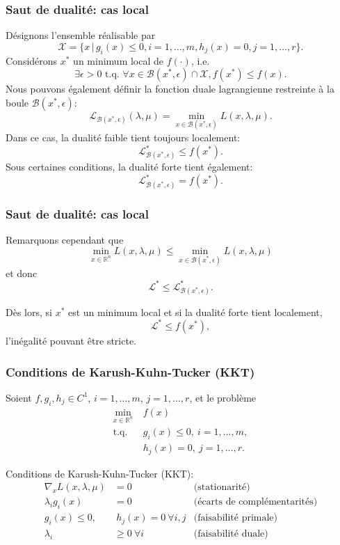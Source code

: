 \documentclass[usepdftitle=false,aspectratio=169]{beamer}
\def\cB{\mathcal{B}}
\def\cL{\mathcal{L}}
\def\cX{\mathcal{X}}
\begin{document}
\begin{frame}
\frametitle{Saut de dualité: cas local}

Désignons l'ensemble réalisable par
$$
\cX = \{ x \,|\, g_i(x) \leq 0, i = 1,\ldots,m, h_j(x) = 0, j = 1,\ldots,r \}.
$$
Considérons $x^*$ un minimum local de $f(\cdot)$, i.e.
$$
\exists \epsilon > 0  \text{ t.q. } \forall x \in \cB(x^*, \epsilon) \cap \cX, f(x^*) \leq f(x).
$$
Nous pouvons également définir la fonction duale lagrangienne restreinte à la boule $\cB(x^*, \epsilon)$:
$$
\cL_{\cB(x^*, \epsilon)}(\lambda, \mu) = \min_{x \in \cB(x^*, \epsilon)} L(x,\lambda, \mu).
$$
Dans ce cas, la dualité faible tient toujours localement:
$$
\cL^*_{\cB(x^*, \epsilon)} \leq f(x^*).
$$
Sous certaines conditions, la dualité forte tient également:
$$
\cL^*_{\cB(x^*, \epsilon)} = f(x^*).
$$

\end{frame}

\begin{frame}
\frametitle{Saut de dualité: cas local}

Remarquons cependant que
$$
\min_{x \in \mathbb{R}^n} L(x, \lambda, \mu) 
\leq \min_{x \in \cB(x^*, \epsilon)} L(x, \lambda, \mu) 
$$
et donc
$$
\cL^* \leq \cL^*_{\cB(x^*, \epsilon)}.
$$

\mbox{}

Dès lors, si $x^*$ est un minimum local et si la dualité forte tient localement,
$$
\cL^* \leq f(x^*),
$$
l'inégalité pouvant être stricte.

\end{frame}

\begin{frame}
\frametitle{Conditions de Karush-Kuhn-Tucker (KKT)}

Soient $f, g_i, h_j \in C^1$, $i = 1,\ldots,m$, $j = 1,\ldots,r$, et le problème
\begin{align*}
\min_{x \in \mathbb{R}^n} \ & f(x) \\
\mbox{t.q. } & g_i(x) \leq 0,\ i = 1,\ldots,m, \\
& h_j(x) = 0,\ j = 1,\ldots,r.
\end{align*}

Conditions de Karush-Kuhn-Tucker (KKT):
\begin{align*}
\nabla_x L(x,\lambda,\mu) &= 0 & \mbox{(stationarité)}\\
\lambda_i g_i(x) &= 0 & \mbox{(écarts de complémentarités)} \\
g_i(x) \leq 0, &\ h_j(x) = 0\ \forall i,j & \mbox{(faisabilité primale)} \\
\lambda_i &\geq 0\ \forall i & \mbox{(faisabilité duale)}
\end{align*}

\end{frame}
\end{document}
